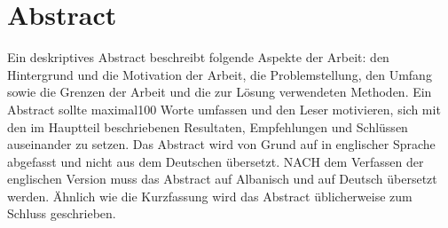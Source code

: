 \chapter*{Abstract}


\color{red} 
Ein deskriptives Abstract beschreibt folgende Aspekte der Arbeit: den Hintergrund und die Motivation der Arbeit, die Problemstellung, den Umfang sowie die Grenzen der Arbeit und die zur L\"osung verwendeten Methoden. Ein Abstract sollte maximal100 Worte umfassen und den Leser motivieren, sich mit den im Hauptteil beschriebenen Resultaten, Empfehlungen und Schl\"ussen auseinander zu setzen. Das Abstract wird von Grund auf in englischer Sprache abgefasst und nicht aus dem Deutschen \"ubersetzt. NACH dem Verfassen der englischen Version muss das Abstract auf Albanisch und auf Deutsch \"ubersetzt werden. \"Ahnlich wie die Kurzfassung wird das Abstract \"ublicherweise zum Schluss geschrieben.
\color{black} 

